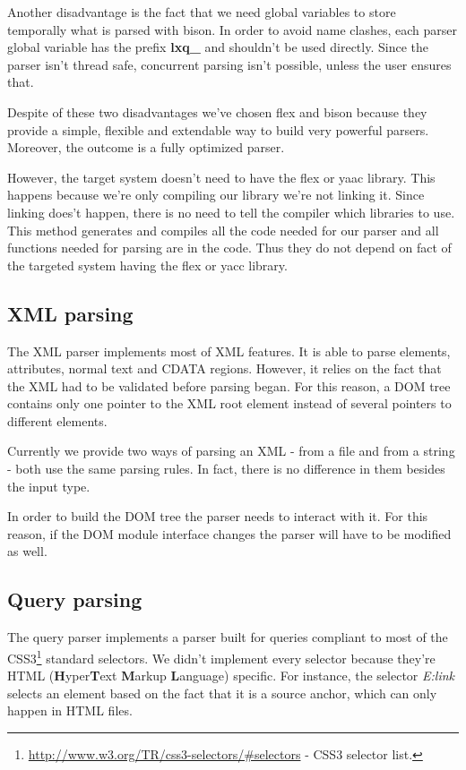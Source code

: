 \documentclass[a4paper]{report}
\begin{document}
	Another disadvantage is the fact that we need global variables to store temporally what is parsed with bison. In order to avoid name clashes, each parser global variable has the prefix \textbf{lxq\_} and shouldn't be used 
	directly. Since the parser isn't thread safe, concurrent parsing isn't possible, unless the user ensures that.
	
	Despite of these two disadvantages we've chosen flex and bison because they provide a simple, flexible and extendable way to build very powerful parsers. Moreover, the outcome is a fully optimized parser.
	
	However, the target system doesn't need to have the flex or yaac library. This happens because we're only compiling our library we're not linking it. Since linking does't happen, there is no need to tell the compiler which 
	libraries to use. This method generates and compiles all the code needed for our parser and all functions needed for parsing are in the code. Thus they do not depend on fact of the targeted system having the flex or yacc 
	library.

	\subsection{XML parsing}
		The XML parser implements most of XML features. It is able to parse elements, attributes, normal text and CDATA regions. However, it relies on the fact that the XML had to be validated before parsing began. For this 
		reason, a DOM tree contains only one pointer to the XML root element instead of several pointers to different elements.
	
		Currently we provide two ways of parsing an XML - from a file and from a string - both use the same parsing rules. In fact, there is no difference in them besides the input type.
		
		In order to build the DOM tree the parser needs to interact with it. For this reason, if the DOM module interface changes the parser will have to be modified as well.
	
	\subsection{Query parsing}	
		The query parser implements a parser built for queries compliant to most of the CSS3\footnote{\url{http://www.w3.org/TR/css3-selectors/\#selectors} - CSS3 selector list.} standard selectors. We didn't implement every
		selector because they're HTML (\textbf{H}yper\textbf{T}ext \textbf{M}arkup \textbf{L}anguage) specific. For instance, the selector \emph{E:link} selects an element based on the fact that it is a source anchor, which can 
		only happen in HTML files. 
	
\end{document}
